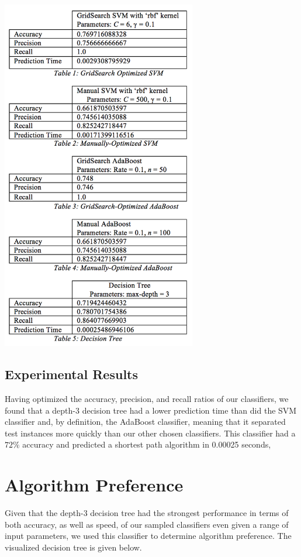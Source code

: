 \documentclass{article}
\begin{document}
\includegraphics[width=8.5cm]{tables}

\subsection{Experimental Results}

Having optimized the accuracy, precision, and recall ratios of our classifiers, we found that a depth-3 decision tree had a lower prediction time than did the SVM classifier and, by definition, the AdaBoost classifier, meaning that it separated test instances more quickly than our other chosen classifiers. This classifier had a $72\%$ accuracy and predicted a shortest path algorithm in 0.00025 seconds,

\section{Algorithm Preference}

Given that the depth-3 decision tree had the strongest performance in terms of both accuracy, as well as speed, of our sampled classifiers even given a range of input parameters, we used this classifier to determine algorithm preference. The visualized decision tree is given below.
\end{document}
